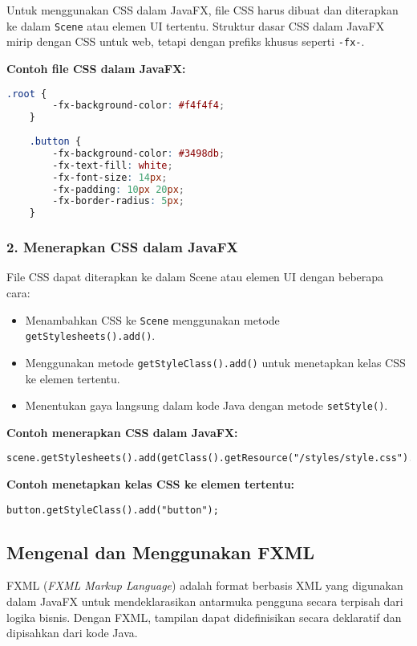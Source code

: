 Untuk menggunakan CSS dalam JavaFX, file CSS harus dibuat dan diterapkan ke dalam \texttt{Scene} atau elemen UI tertentu. Struktur dasar CSS dalam JavaFX mirip dengan CSS untuk web, tetapi dengan prefiks khusus seperti \texttt{-fx-}.

\textbf{Contoh file CSS dalam JavaFX:}
\begin{lstlisting}[language=css, caption=Contoh file CSS dalam JavaFX]
	.root {
		-fx-background-color: #f4f4f4;
	}
	
	.button {
		-fx-background-color: #3498db;
		-fx-text-fill: white;
		-fx-font-size: 14px;
		-fx-padding: 10px 20px;
		-fx-border-radius: 5px;
	}
\end{lstlisting}

\subsubsection{2. Menerapkan CSS dalam JavaFX}

File CSS dapat diterapkan ke dalam Scene atau elemen UI dengan beberapa cara:

\begin{itemize}
	\item Menambahkan CSS ke \texttt{Scene} menggunakan metode \texttt{getStylesheets().add()}.
	\item Menggunakan metode \texttt{getStyleClass().add()} untuk menetapkan kelas CSS ke elemen tertentu.
	\item Menentukan gaya langsung dalam kode Java dengan metode \texttt{setStyle()}.
\end{itemize}

\textbf{Contoh menerapkan CSS dalam JavaFX:}
\begin{lstlisting}[style=JavaStyle, caption=Menerapkan CSS ke Scene]
	scene.getStylesheets().add(getClass().getResource("/styles/style.css").toExternalForm());
\end{lstlisting}

\textbf{Contoh menetapkan kelas CSS ke elemen tertentu:}
\begin{lstlisting}[style=JavaStyle, caption=Menetapkan kelas CSS ke tombol]
	button.getStyleClass().add("button");
\end{lstlisting}

\subsection{Mengenal dan Menggunakan FXML}

FXML (\textit{FXML Markup Language}) adalah format berbasis XML yang digunakan dalam JavaFX untuk mendeklarasikan antarmuka pengguna secara terpisah dari logika bisnis. Dengan FXML, tampilan dapat didefinisikan secara deklaratif dan dipisahkan dari kode Java.

